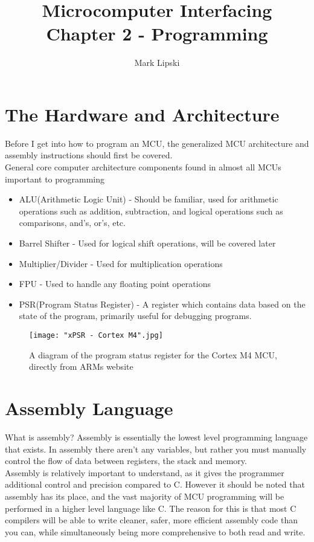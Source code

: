 \documentclass[10pt]{article}
\title{Microcomputer Interfacing Chapter 2 - Programming}
\author{Mark Lipski}
\begin{document}
\maketitle
\section{The Hardware and Architecture}
Before I get into how to program an MCU, the generalized MCU architecture and assembly instructions should first be covered.\\

General core computer architecture components found in almost all MCUs important to programming
\begin{itemize}
\item ALU(Arithmetic Logic Unit) - Should be familiar, used for arithmetic operations such as addition, subtraction, and logical operations such as comparisons, and's, or's, etc.
\item Barrel Shifter - Used for logical shift operations, will be covered later
\item Multiplier/Divider - Used for multiplication operations
\item FPU - Used to handle any floating point operations
\item PSR(Program Status Register) - A register which contains data based on the state of the program, primarily useful for debugging programs.
\end{itemize}

\begin{figure}[H]
\texttt{[image: "xPSR - Cortex M4".jpg]}
\caption{A diagram of the program status register for the Cortex M4 MCU, directly from ARMs website}
\end{figure}

\section{Assembly Language}
What is assembly? Assembly is essentially the lowest level programming language that exists. In assembly there aren't any variables, but rather you must manually control the flow of data between registers, the stack and memory. \\

Assembly is relatively important to understand, as it gives the programmer additional control and precision compared to C. However it should be noted that assembly has its place, and the vast majority of MCU programming will be performed in a higher level language like C. The reason for this is that most C compilers will be able to write cleaner, safer, more efficient assembly code than you can, while simultaneously being more comprehensive to both read and write.\\
\end{document}
